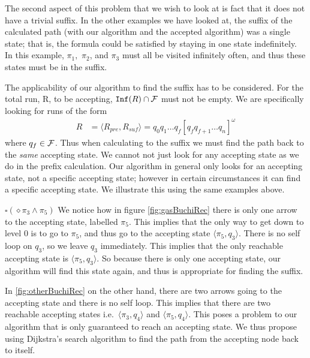 The second aspect of this problem that we wish to look at is fact that it does not have a trivial suffix. In the other examples we have looked at, the suffix of the calculated path (with our algorithm and the accepted algorithm) was a single state; that is, the formula could be satisfied by staying in one state indefinitely. In this example, $\pi_1,$ $\pi_2$, and $\pi_3$ must all be visited infinitely often, and thus these states must be in the suffix. 

The applicability of our algorithm to find the suffix has to be considered. For the total run, R, to be accepting, $\texttt{Inf}(R) \cap \mathcal{F}$ must not be empty. We are specifically looking for runs of the form 
\begin{align*}
R &= \langle R_{pre}, R_{suf} \rangle = q_0 q_1 \dots q_f [q_f q_{f+1} \dots q_n]^\omega
\end{align*}     
where $q_f \in \mathcal{F}$. Thus when calculating to the suffix we must find the path back to the \textit{same} accepting state. We cannot not just look for any accepting state as we do in the prefix calculation. Our algorithm in general only looks for an accepting state, not a specific accepting state; however in certain circumstances it can find a specific accepting state. We illustrate this using the same examples above. 

$\square (\diamond \pi_3 \wedge \pi_5)$ 
We notice how in figure \ref{fig:gasBuchiRec} there is only one arrow to the accepting state, labelled $\pi_5$. This implies that the only way to get down to level 0 is to go to $\pi_5$, and thus go to the accepting state $\langle \pi_5, q_3 \rangle$. There is no self loop on $q_3$, so we leave $q_3$ immediately. This implies that the only reachable accepting state is $\langle \pi_5, q_3 \rangle$. So because there is only one accepting state, our algorithm will find this state again, and thus is appropriate for finding the suffix. 

In \ref{fig:otherBuchiRec} on the other hand, there are two arrows going to the accepting state and there is no self loop. This implies that there are two reachable accepting states i.e.\ $\langle \pi_3, q_4 \rangle$ and $\langle \pi_5, q_4 \rangle$. This poses a problem to our algorithm that is only guaranteed to reach an accepting state. We thus propose using Dijkstra's search algorithm to find the path from the accepting node back to itself.   